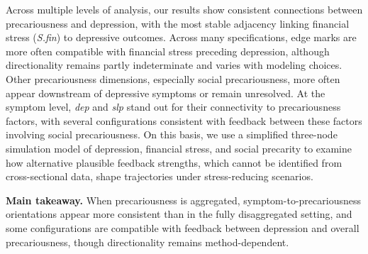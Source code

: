 \documentclass[
]{article}
\begin{document}
\textcolor{BrickRed}{Across multiple levels of analysis, our results show consistent connections between precariousness and depression, with the most stable adjacency linking financial stress (\textit{S.fin}) to depressive outcomes. Across many specifications, edge marks are more often compatible with financial stress preceding depression, although directionality remains partly indeterminate and varies with modeling choices. Other precariousness dimensions, especially social precariousness, more often appear downstream of depressive symptoms or remain unresolved. At the symptom level, \textit{dep} and \textit{slp} stand out for their connectivity to precariousness factors, with several configurations consistent with feedback between these factors involving social precariousness. On this basis, we use a simplified three-node simulation model of depression, financial stress, and social precarity to examine how alternative plausible feedback strengths, which cannot be identified from cross-sectional data, shape trajectories under stress-reducing scenarios.}

\textcolor{BrickRed}{\textbf{Main takeaway.} When precariousness is aggregated, symptom-to-precariousness orientations appear more consistent than in the fully disaggregated setting, and some configurations are compatible with feedback between depression and overall precariousness, though directionality remains method-dependent.}

\end{document}
